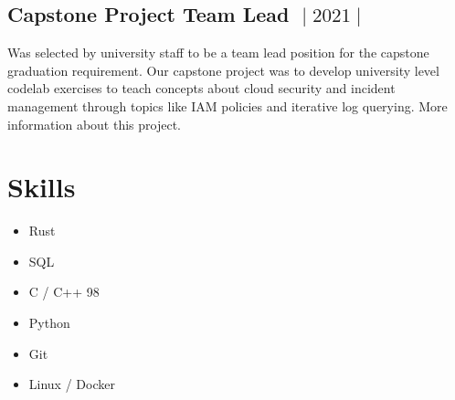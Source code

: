 \documentclass{article}
\begin{document}
\subsection{Capstone Project Team Lead $\;\vert\;2021\;\vert\;$}
Was selected by university staff to be a team lead position for the capstone graduation requirement. Our
capstone project was to develop university level codelab exercises to teach concepts about cloud security
and incident management through topics like IAM policies and iterative log querying.
More information about this project.

\section{Skills}
\begin{itemize}
      \item Rust
      \item SQL
      \item C / C++ 98
      \item Python
      \item Git
      \item Linux / Docker
\end{itemize}
\end{document}

